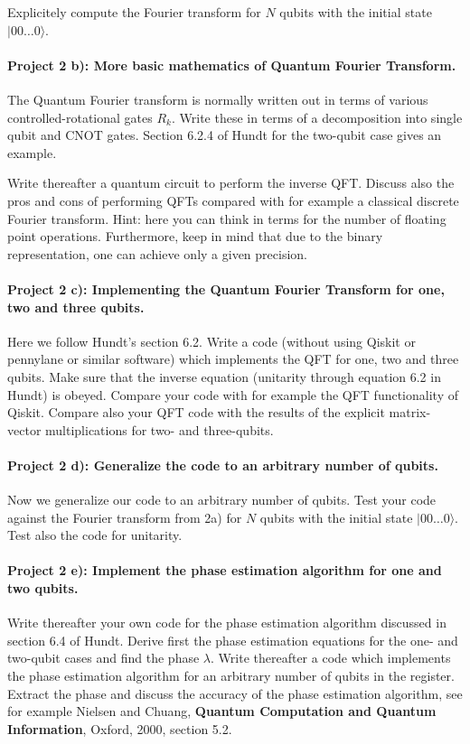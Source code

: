 \documentclass[%
oneside,                 %
final,                   %
10pt]{article}
\begin{document}
Explicitely compute the Fourier transform for $N$ qubits with the initial state $\vert 00\dots 0\rangle$.

\paragraph{Project 2 b): More basic mathematics of  Quantum Fourier Transform.}
The Quantum Fourier transform is normally written out in terms of
various controlled-rotational gates $R_k$. Write these in terms of a
decomposition into single qubit and CNOT gates.  Section 6.2.4 of Hundt for the two-qubit case gives an example.

Write thereafter a quantum circuit to perform the inverse QFT.
Discuss also the pros and cons of performing QFTs compared with for example a classical discrete Fourier transform. Hint: here you can think in terms for the number of floating point operations. Furthermore, keep in mind that due to the binary representation, one can achieve only a given precision. 

\paragraph{Project 2 c): Implementing the Quantum Fourier Transform for one, two and three qubits.}
Here we follow Hundt's section 6.2. Write a code (without using Qiskit or pennylane or similar software) which implements the QFT
for one, two and three qubits. Make sure that the inverse equation (unitarity through equation 6.2 in Hundt) is obeyed. 
Compare your code with for example the QFT functionality of Qiskit.  Compare also your QFT code with the results of the explicit matrix-vector multiplications for two- and three-qubits.

\paragraph{Project 2 d): Generalize the code to an arbitrary number of qubits.}
Now we generalize our code to an arbitrary number of qubits. Test your
code against the Fourier transform from 2a) for $N$ qubits with the
initial state $\vert 00\dots 0\rangle$. Test also the code for unitarity.

\paragraph{Project 2 e): Implement the phase estimation algorithm for one and two qubits.}
Write thereafter your own code for the phase estimation algorithm
discussed in section 6.4 of Hundt. Derive first the phase estimation
equations for the one- and two-qubit cases and find the phase
$\lambda$. Write thereafter a code which implements the phase
estimation algorithm for an arbitrary number of qubits in the
register. Extract the phase and discuss the accuracy of the phase
estimation algorithm, see for example Nielsen and Chuang, \textbf{Quantum Computation and Quantum Information}, Oxford, 2000, section 5.2.
\end{document}
